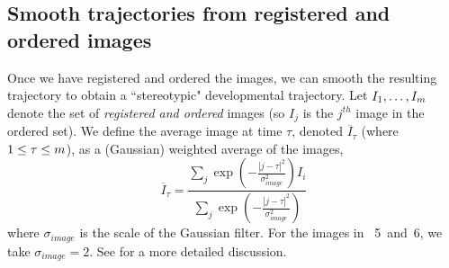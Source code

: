 %
%
%




\subsection{Smooth trajectories from registered and ordered images} \label{sec:smooth_traj}

Once we have registered and ordered the images, we can smooth the resulting trajectory to obtain a ``stereotypic" developmental trajectory.
%
Let $I_1, \dots, I_m$ denote the set of {\em registered and ordered} images (so $I_j$ is the $j^{th}$ image in the ordered set).
%
We define the average image at time $\tau$, denoted $\overline{I}_{\tau}$ (where $1 \le \tau \le m$), as a (Gaussian) weighted average of the images,
\begin{equation}
\overline{I}_{\tau} =  \frac{\sum_j \exp \left( - \frac{|j - \tau|^2}{\sigma_{image}^2} \right) I_i}{\sum_j \exp \left( - \frac{|j - \tau|^2}{\sigma_{image}^2} \right) }
\end{equation}
where $\sigma_{image}$ is the scale of the Gaussian filter.
%
For the images in \fig~5~and~6, we take $\sigma_{image} = 2$.
%
See \citep{kemelmacher2011exploring} for a more detailed discussion.







